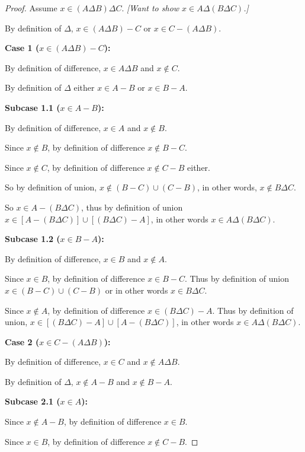 \documentclass[14pt]{extarticle}
\begin{document}
\begin{proof}
  Assume \(x \in (A \Delta B) \Delta C\). {\it [Want to show \(x \in A \Delta (B \Delta C)\).]}

  By definition of $\Delta$, \(x \in (A \Delta B) - C\) or \(x \in C-(A \Delta B)\).

    {\bf Case 1 (\(x \in (A \Delta B) - C\)):}

  By definition of difference, \(x \in A \Delta B\) and \(x \notin C\).

  By definition of $\Delta$ either \(x \in A - B\) or \(x \in B - A\).

    {\bf Subcase 1.1 (\(x \in A-B\)):}

  By definition of difference, \(x \in A\) and \(x \notin B\).

  Since \(x \notin B\), by definition of difference \(x \notin B-C\).

  Since \(x \notin C\), by definition of difference \(x \notin C-B\) either.

  So by definition of union, \(x \notin (B-C) \cup (C-B)\), in other words, \(x \notin B \Delta C\).

  So \(x \in A - (B \Delta C)\), thus by definition of union \(x \in [A - (B \Delta C)] \cup [(B \Delta C) - A]\),
  in other words \(x \in A \Delta (B \Delta C)\).

    {\bf Subcase 1.2 (\(x \in B-A\)):}

  By definition of difference, \(x \in B\) and \(x \notin A\).

  Since \(x \in B\), by definition of difference \(x \in B-C\). Thus by definition of union \(x \in (B-C) \cup (C-B)\)
  or in other words \(x \in B \Delta C\).

  Since \(x \notin A\), by definition of difference \(x \in (B \Delta C) - A\). Thus by definition of union,
  \(x \in [(B \Delta C) - A] \cup [A - (B \Delta C)]\), in other words \(x \in A \Delta (B \Delta C)\).

    {\bf Case 2 (\(x \in C - (A \Delta B)\)):}

  By definition of difference, \(x \in C\) and \(x \notin A \Delta B\).

  By definition of $\Delta$, \(x \notin A - B\) and \(x \notin B - A\).

    {\bf Subcase 2.1 (\(x \in A\)):}

  Since \(x \notin A - B\), by definition of difference \(x \in B\).

  Since \(x \in B\), by definition of difference \(x \notin C - B\).


\end{proof}
\end{document}
